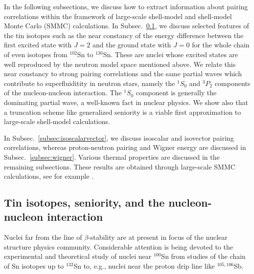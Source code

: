 \documentclass[rmp,aps,floatfix]{revtex4}
\begin{document}
In the following subsections, we discuss how to extract information
about pairing correlations 
within the framework
of large-scale shell-model and shell-model Monte Carlo (SMMC) 
calculations. 
In Subsec.~\ref{subsec:seniority}, we discuss selected features
of the tin isotopes such as the near constancy of the energy difference 
between the first excited state with $J=2$ and the ground state
with $J=0$ for the whole chain of even isotopes from
$^{102}$Sn to $^{130}$Sn. 
These are nuclei whose excited states are well reproduced by the neutron
model space mentioned above.
We relate this near constancy to strong pairing
correlations and the same partial waves which contribute
to superfluiditity in neutron stars, namely the $^1S_0$ and 
$^3P_2$ components of the nucleon-nucleon interaction.
The $^1S_0$ component is generally the dominating partial wave, 
a well-known fact in nuclear
physics.
We show also that a truncation scheme like generalized
seniority \cite{talmi93} is a viable first approximation to large-scale
shell-model calculations.  

In Subsec.~\ref{subsec:isoscalarvector}, we discuss isoscalar and isovector
pairing correlations, whereas proton-neutron pairing and Wigner energy are
discussed in Subsec.~\ref{subsec:wigner}. Various thermal properties
are discussed in the remaining subsections. These results are obtained 
through large-scale SMMC calculations, see for example \cite{kdl97}.


\subsection{Tin isotopes, seniority, and the nucleon-nucleon interaction}
\label{subsec:seniority}

Nuclei far from the line of $\beta$-stability are at present in
focus of the nuclear structure physics community. 
Considerable attention is being devoted to the
experimental and theoretical 
study of nuclei near 
$^{100}$Sn from studies of the chain of Sn isotopes
up to $^{132}$Sn to, e.g., nuclei 
near the proton drip line like $^{105,106}$Sb. 
\end{document}

